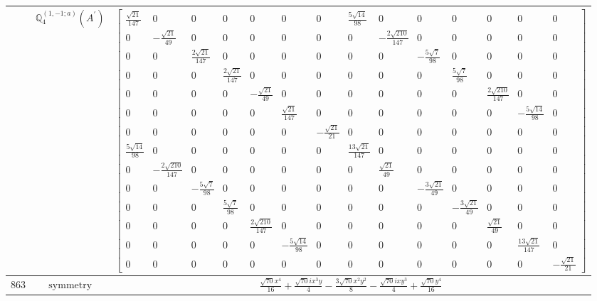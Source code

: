 \documentclass[fleqn,8pt,landscape]{jsarticle}
\begin{document}
\begin{longtable}{ccc}
$  $ & $ \mathbb{Q}_{4}^{(1,-1;a)}(A^{\prime}) $ & $ \begin{bmatrix} \frac{\sqrt{21}}{147} & 0 & 0 & 0 & 0 & 0 & 0 & \frac{5 \sqrt{14}}{98} & 0 & 0 & 0 & 0 & 0 & 0 \\ 0 & - \frac{\sqrt{21}}{49} & 0 & 0 & 0 & 0 & 0 & 0 & - \frac{2 \sqrt{210}}{147} & 0 & 0 & 0 & 0 & 0 \\ 0 & 0 & \frac{2 \sqrt{21}}{147} & 0 & 0 & 0 & 0 & 0 & 0 & - \frac{5 \sqrt{7}}{98} & 0 & 0 & 0 & 0 \\ 0 & 0 & 0 & \frac{2 \sqrt{21}}{147} & 0 & 0 & 0 & 0 & 0 & 0 & \frac{5 \sqrt{7}}{98} & 0 & 0 & 0 \\ 0 & 0 & 0 & 0 & - \frac{\sqrt{21}}{49} & 0 & 0 & 0 & 0 & 0 & 0 & \frac{2 \sqrt{210}}{147} & 0 & 0 \\ 0 & 0 & 0 & 0 & 0 & \frac{\sqrt{21}}{147} & 0 & 0 & 0 & 0 & 0 & 0 & - \frac{5 \sqrt{14}}{98} & 0 \\ 0 & 0 & 0 & 0 & 0 & 0 & - \frac{\sqrt{21}}{21} & 0 & 0 & 0 & 0 & 0 & 0 & 0 \\ \frac{5 \sqrt{14}}{98} & 0 & 0 & 0 & 0 & 0 & 0 & \frac{13 \sqrt{21}}{147} & 0 & 0 & 0 & 0 & 0 & 0 \\ 0 & - \frac{2 \sqrt{210}}{147} & 0 & 0 & 0 & 0 & 0 & 0 & \frac{\sqrt{21}}{49} & 0 & 0 & 0 & 0 & 0 \\ 0 & 0 & - \frac{5 \sqrt{7}}{98} & 0 & 0 & 0 & 0 & 0 & 0 & - \frac{3 \sqrt{21}}{49} & 0 & 0 & 0 & 0 \\ 0 & 0 & 0 & \frac{5 \sqrt{7}}{98} & 0 & 0 & 0 & 0 & 0 & 0 & - \frac{3 \sqrt{21}}{49} & 0 & 0 & 0 \\ 0 & 0 & 0 & 0 & \frac{2 \sqrt{210}}{147} & 0 & 0 & 0 & 0 & 0 & 0 & \frac{\sqrt{21}}{49} & 0 & 0 \\ 0 & 0 & 0 & 0 & 0 & - \frac{5 \sqrt{14}}{98} & 0 & 0 & 0 & 0 & 0 & 0 & \frac{13 \sqrt{21}}{147} & 0 \\ 0 & 0 & 0 & 0 & 0 & 0 & 0 & 0 & 0 & 0 & 0 & 0 & 0 & - \frac{\sqrt{21}}{21} \end{bmatrix} $ \\ \hline
$ 863 $ & $ \text{symmetry} $ & $ \frac{\sqrt{70} x^{4}}{16} + \frac{\sqrt{70} i x^{3} y}{4} - \frac{3 \sqrt{70} x^{2} y^{2}}{8} - \frac{\sqrt{70} i x y^{3}}{4} + \frac{\sqrt{70} y^{4}}{16} $ \\

\end{longtable}
\end{document}
